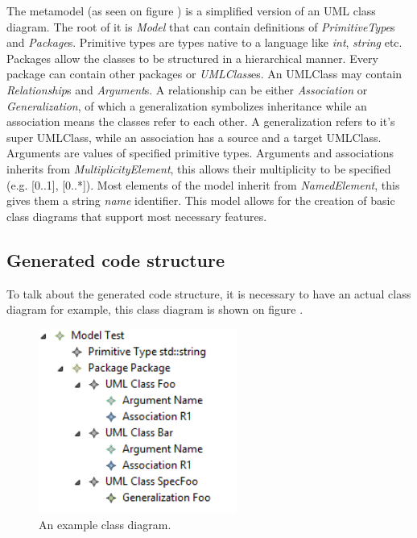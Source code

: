 The metamodel (as seen on figure ) is a simplified version of
an UML class diagram. The root of it is \emph{Model} that can contain
definitions of \emph{PrimitiveType}s and \emph{Package}s. Primitive types are
types native to a language like \emph{int}, \emph{string} etc. Packages allow
the classes to be structured in a hierarchical manner. Every package can contain
other packages or \emph{UMLClass}es. An UMLClass may contain
\emph{Relationship}s and \emph{Argument}s. A relationship can be either
\emph{Association} or \emph{Generalization}, of which a generalization
symbolizes inheritance while an association means the classes refer to each
other. A generalization refers to it's super UMLClass, while an association has
a source and a target UMLClass. Arguments are values of specified primitive
types. Arguments and associations inherits from \emph{MultiplicityElement}, this
allows their multiplicity to be specified (e.g. [0..1], [0..*]). Most elements
of the model inherit from \emph{NamedElement}, this gives them a string
\emph{name} identifier. This model allows for the creation of basic class
diagrams that support most necessary features.

\subsection{Generated code structure}\label{sect:GeneratedCodeStructure}

To talk about the generated code structure, it is necessary to have an actual
class diagram for example, this class diagram is shown on figure
.

\begin{figure}[!ht]
\centering
\includegraphics[width=65mm, keepaspectratio]{figures/instance_model.png}
\caption{An example class diagram.}
\label{fig:InstanceModel}
\end{figure}

